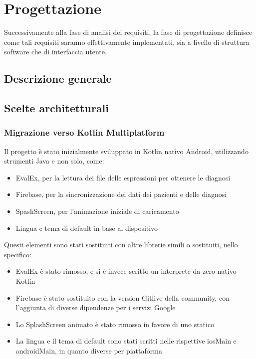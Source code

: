 
\chapter{Progettazione}\label{ch:progettazione}

Successivamente alla fase di analisi dei requisiti, la fase di progettazione definisce come tali requisiti saranno
effettivamente implementati, sia a livello di struttura software che di interfaccia utente.

\section{Descrizione generale}\label{sec:descrizione-generale}

\section{Scelte architetturali}\label{sec:scelte-architetturali}

\subsection{Migrazione verso Kotlin Multiplatform}\label{subsec:migrazione-verso-kotlin-multiplatform}

Il progetto è stato inizialmente sviluppato in Kotlin nativo Android, utilizzando strumenti Java e non solo, come:

\begin{itemize}
    \item EvalEx, per la lettura dei file delle espressioni per ottenere le diagnosi
    \item Firebase, per la sincronizzazione dei dati dei pazienti e delle diagnosi
    \item SpashScreen, per l'animazione iniziale di caricamento
    \item Lingua e tema di default in base al dispositivo
\end{itemize}

Questi elementi sono stati sostituiti con altre librerie simili o sostituiti, nello specifico:

\begin{itemize}
    \item EvalEx è stato rimosso, e si è invece scritto un interprete da zero nativo Kotlin
    \item Firebase è stato sostituito con la version Gitlive della community, con l'aggiunta di diverse dipendenze per i servizi Google
    \item Lo SplashScreen animato è stato rimosso in favore di uno statico
    \item La lingua e il tema di default sono stati scritti nelle rispettive iosMain e androidMain, in quanto diverse per piattaforma
\end{itemize}

